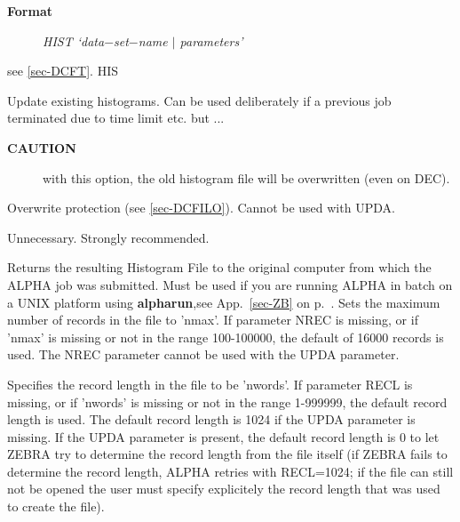 \begin{description}\item[\bf{Format
}]{\it HIST `data$-$set$-$name $\mid$ parameters'}\end{description}
\begin{indentlist}{ 4.00cm}{ 4.25cm}
see \ref{sec-DCFT}.
HIS
 
Update existing histograms. Can be used deliberately if a
previous job terminated due to time limit etc. but ...
\begin{description}\item[\bf{CAUTION}]with this option, the old histogram
file will be
overwritten (even on DEC).\end{description}
Overwrite protection (see \ref{sec-DCFILO}).
Cannot be used with UPDA.
\begin{indentlist}{ 2.50cm}{ 2.75cm}
Unnecessary.
Strongly recommended.
\end{indentlist}
                  Returns the resulting Histogram File to the original computer from which the ALPHA job was submitted.
                  Must be used if you are running ALPHA in batch on a UNIX platform using {\bf alpharun},see 
                  App.~\ref{sec-ZB} on p.~\pageref{sec-ZB}.
                  Sets the maximum number of records in the file to 'nmax'.
                  If parameter NREC is missing, or if 'nmax' is missing
                  or not in the range 100-100000, the default of 16000
                  records is used.
                  The NREC parameter cannot be used with the UPDA parameter.
 
                  Specifies the record length in the file to be 'nwords'.
                  If parameter RECL is missing, or if 'nwords' is missing
                  or not in the range 1-999999, the default record length
                  is used.
                  The default record length is 1024 if the UPDA parameter
                  is missing. If the UPDA parameter is present, the default
                  record length is 0 to let ZEBRA try to determine the
                  record length from the file itself (if ZEBRA fails to
                  determine the record length, ALPHA retries with RECL=1024;
                  if the file can still not be opened the user must specify
                  explicitely the record length that was used to create
                  the file).
 
\end{indentlist}
 
